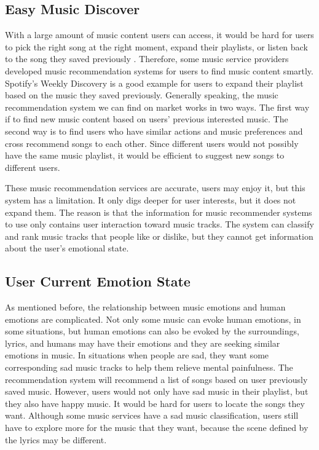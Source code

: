 \subsection{Easy Music Discover}

With a large amount of music content users can access, it would be hard for users to pick the right song at the right moment, expand their playlists, or listen back to the song they saved previously \cite{palaniappan2018}. Therefore, some music service providers developed music recommendation systems for users to find music content smartly. Spotify's Weekly Discovery is a good example for users to expand their playlist based on the music they saved previously. Generally speaking, the music recommendation system we can find on market works in two ways. The first way if to find new music content based on users' previous interested music. The second way is to find users who have similar actions and music preferences and cross recommend songs to each other. Since different users would not possibly have the same music playlist, it would be efficient to suggest new songs to different users.

These music recommendation services are accurate, users may enjoy it, but this system has a limitation. It only digs deeper for user interests, but it does not expand them. The reason is that the information for music recommender systems to use only contains user interaction toward music tracks. The system can classify and rank music tracks that people like or dislike, but they cannot get information about the user's emotional state.

\subsection{User Current Emotion State}

As mentioned before, the relationship between music emotions and human emotions are complicated. Not only some music can evoke human emotions, in some situations, but human emotions can also be evoked by the surroundings, lyrics, and humans may have their emotions and they are seeking similar emotions in music. In situations when people are sad, they want some corresponding sad music tracks to help them relieve mental painfulness. The recommendation system will recommend a list of songs based on user previously saved music. However, users would not only have sad music in their playlist, but they also have happy music. It would be hard for users to locate the songs they want. Although some music services have a sad music classification, users still have to explore more for the music that they want, because the scene defined by the lyrics may be different.

